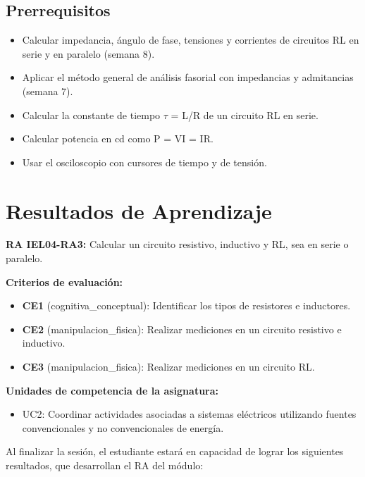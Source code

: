 \documentclass[11pt,letterpaper]{article}
\begin{document}
\subsection{Prerrequisitos}

\begin{itemize}
  \item Calcular impedancia, ángulo de fase, tensiones y corrientes de circuitos RL en serie y en paralelo (semana 8).
  \item Aplicar el método general de análisis fasorial con impedancias y admitancias (semana 7).
  \item Calcular la constante de tiempo \ensuremath{\tau} = L/R de un circuito RL en serie.
  \item Calcular potencia en cd como P = VI = I\texttwosuperior{}R.
  \item Usar el osciloscopio con cursores de tiempo y de tensión.
\end{itemize}

\section{Resultados de Aprendizaje}

\begin{alineacion}
\textbf{RA IEL04-RA3:} Calcular un circuito resistivo, inductivo y RL, sea en serie o paralelo.

\textbf{Criterios de evaluación:}

\begin{itemize}
  \item \textbf{CE1} (cognitiva\_conceptual): Identificar los tipos de resistores e inductores.
  \item \textbf{CE2} (manipulacion\_fisica): Realizar mediciones en un circuito resistivo e inductivo.
  \item \textbf{CE3} (manipulacion\_fisica): Realizar mediciones en un circuito RL.
\end{itemize}

\textbf{Unidades de competencia de la asignatura:}

\begin{itemize}
  \item UC2: Coordinar actividades asociadas a sistemas eléctricos utilizando fuentes convencionales y no convencionales de energía.
\end{itemize}
\end{alineacion}

Al finalizar la sesión, el estudiante estará en capacidad de lograr los siguientes resultados, que desarrollan el RA del módulo:
\end{document}
